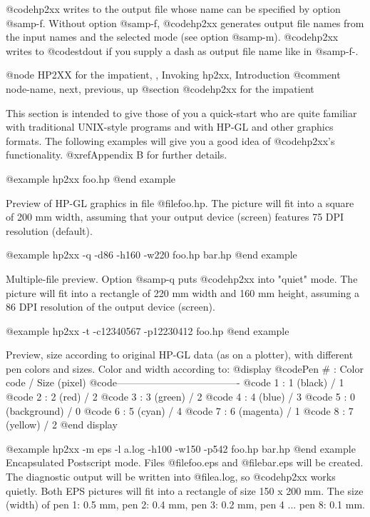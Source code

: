 @code{hp2xx} writes to the output file whose name can be specified
by option @samp{-f}. Without option @samp{-f}, @code{hp2xx} generates
output file names from the input names and the selected mode
(see option @samp{-m}). @code{hp2xx} writes to @code{stdout} if you supply
a dash as output file name like in @samp{-f-}.



@node HP2XX for the impatient, , Invoking hp2xx, Introduction
@comment  node-name,  next,  previous,  up
@section @code{hp2xx} for the impatient

This section is intended to give those of you a quick-start who are
quite familiar with traditional UNIX-style programs and with HP-GL and
other graphics formats.
The following examples will give you a good idea of @code{hp2xx}'s
functionality. @xref{Appendix B} for further details.


@example
hp2xx foo.hp
@end example

Preview of HP-GL graphics in file @file{foo.hp}. The picture will
fit into a square of 200 mm width, assuming that your output device
(screen) features 75 DPI resolution (default).

@example
hp2xx -q -d86 -h160 -w220  foo.hp bar.hp
@end example

Multiple-file preview. Option @samp{-q} puts @code{hp2xx} into "quiet" mode.
The picture will fit into a rectangle of 220 mm width and 160 mm height,
assuming a 86 DPI resolution of the output device (screen).

@example
hp2xx -t -c12340567 -p12230412 foo.hp
@end example

Preview, size according to original HP-GL data (as on a plotter),
with different pen colors and sizes. Color and width according to:
@display
  @code{Pen # : Color code     / Size (pixel)}
  @code{-------------------------------------}
  @code{  1   : 1 (black)      /    1}
  @code{  2   : 2 (red)        /    2}
  @code{  3   : 3 (green)      /    2}
  @code{  4   : 4 (blue)       /    3}
  @code{  5   : 0 (background) /    0}
  @code{  6   : 5 (cyan)       /    4}
  @code{  7   : 6 (magenta)    /    1}
  @code{  8   : 7 (yellow)     /    2}
@end display

@example
hp2xx -m eps -l a.log -h100 -w150 -p542  foo.hp bar.hp
@end example
Encapsulated Postscript mode. Files @file{foo.eps} and @file{bar.eps}
will be created. The diagnostic output will be written into @file{a.log},
so @code{hp2xx} works quietly. Both EPS pictures will fit into a
rectangle of size 150 x 200 mm. The size (width) of
pen 1: 0.5 mm, pen 2: 0.4 mm, pen 3: 0.2 mm, pen 4 ... pen 8: 0.1 mm.

